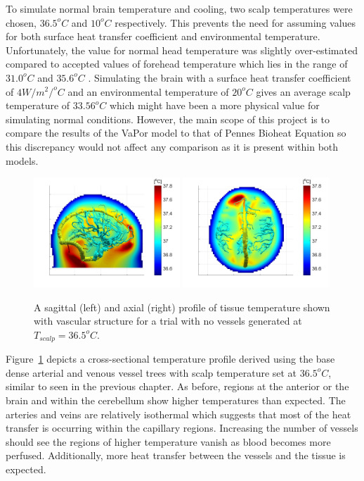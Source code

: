 \documentclass[11pt,english,a4paper,twoside,openright]{report}
\begin{document}
{{{{{{{{To simulate normal brain temperature and cooling, two scalp temperatures were chosen, $36.5^{o}C$ and $10^{o}C$ respectively. This prevents the need for assuming values for both surface heat transfer coefficient and environmental temperature. Unfortunately, the value for normal head temperature was slightly over-estimated compared to accepted values of forehead temperature which lies in the range of $31.0^{o}C$ and $35.6^{o}C$ \cite{ng2005brief}. Simulating the brain with a surface heat transfer coefficient of $4W/m^{2}/^{o}C$ and an environmental temperature of $20^{o}C$ gives an average scalp temperature of $33.56^{o}C$ which might have been a more physical value for simulating normal conditions. However, the main scope of this project is to compare the results of the VaPor model to that of Pennes Bioheat Equation so this discrepancy would not affect any comparison as it is present within both models.  

\begin{figure}[h]
	\centering
	\includegraphics[width=0.49\textwidth]{Chapter3/Chapter3Result1}
	\includegraphics[width=0.49\textwidth]{Chapter3/Chapter3Result2}
	\caption[Profiles of tissue temperature  shown with vascular structure for a trial with no vessels generated at $T_{scalp}=36.5^{o}C$]{A sagittal (left) and axial (right) profile of tissue temperature shown with vascular structure for a trial with no vessels generated at $T_{scalp}=36.5^{o}C$.}
	\label{fig:Chapter3Results1}
\end{figure}

Figure~\ref{fig:Chapter3Results1} depicts a cross-sectional temperature profile derived using the base dense arterial and venous vessel trees with scalp temperature set at $36.5^{o}C$, similar to seen in the previous chapter. As before, regions at the anterior or the brain and within the cerebellum show higher temperatures than expected. The arteries and veins are relatively isothermal which suggests that most of the heat transfer is occurring within the capillary regions. Increasing the number of vessels should see the regions of higher temperature vanish as blood becomes more perfused. Additionally, more heat transfer between the vessels and the tissue is expected.

}}}}}}}}
\end{document}
